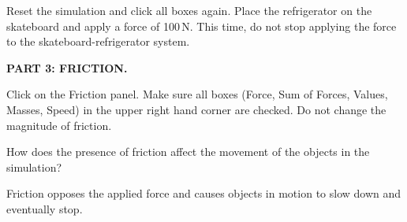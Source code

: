 \documentclass[answers]{exam}
\begin{document}
\begin{questions}
\question
Reset the simulation and click all boxes again. Place the refrigerator on the skateboard and apply a force of 100\,N. This time, do not stop applying the force to the skateboard-refrigerator system. 


\begin{EnvUplevel}
    \textbf{PART 3: FRICTION.}

    Click on the Friction panel. Make sure all boxes (Force, Sum of Forces, Values, Masses, Speed) in the upper right hand corner are checked. Do not change the magnitude of friction.
\end{EnvUplevel}

\question
How does the presence of friction affect the movement of the objects in the simulation?

\begin{solution}
    Friction opposes the applied force and causes objects in motion to slow down and eventually stop.
\end{solution}


\end{questions}
\end{document}
